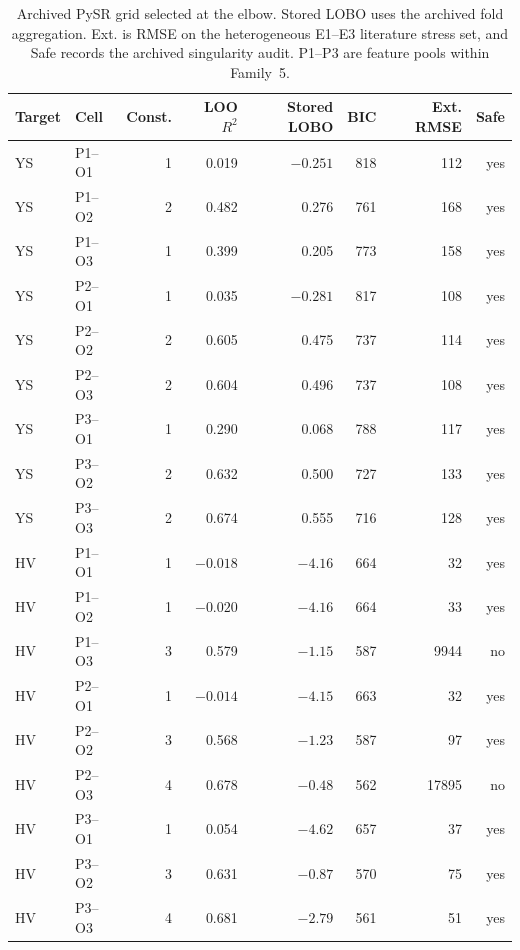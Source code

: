 \documentclass[a4paper,11pt]{article}
\begin{document}
\begin{table}[H]
\centering
\caption{Archived PySR grid selected at the elbow. Stored LOBO uses the archived fold aggregation. Ext. is RMSE on the heterogeneous E1--E3 literature stress set, and Safe records the archived singularity audit. P1--P3 are feature pools within Family~5.}
\label{tab:pysrgrid}
\footnotesize
\setlength{\tabcolsep}{3.5pt}
\begin{tabular}{llrrrrrr}
\toprule
Target & Cell & Const. & LOO $R^2$ & Stored LOBO & BIC & Ext. RMSE & Safe \\
\midrule
YS & P1--O1 & 1 & 0.019 & $-0.251$ & 818 & 112 & yes \\
YS & P1--O2 & 2 & 0.482 & 0.276 & 761 & 168 & yes \\
YS & P1--O3 & 1 & 0.399 & 0.205 & 773 & 158 & yes \\
YS & P2--O1 & 1 & 0.035 & $-0.281$ & 817 & 108 & yes \\
YS & P2--O2 & 2 & 0.605 & 0.475 & 737 & 114 & yes \\
YS & P2--O3 & 2 & 0.604 & 0.496 & 737 & 108 & yes \\
YS & P3--O1 & 1 & 0.290 & 0.068 & 788 & 117 & yes \\
YS & P3--O2 & 2 & 0.632 & 0.500 & 727 & 133 & yes \\
YS & P3--O3 & 2 & 0.674 & 0.555 & 716 & 128 & yes \\
\midrule
HV & P1--O1 & 1 & $-0.018$ & $-4.16$ & 664 & 32 & yes \\
HV & P1--O2 & 1 & $-0.020$ & $-4.16$ & 664 & 33 & yes \\
HV & P1--O3 & 3 & 0.579 & $-1.15$ & 587 & 9944 & no \\
HV & P2--O1 & 1 & $-0.014$ & $-4.15$ & 663 & 32 & yes \\
HV & P2--O2 & 3 & 0.568 & $-1.23$ & 587 & 97 & yes \\
HV & P2--O3 & 4 & 0.678 & $-0.48$ & 562 & 17895 & no \\
HV & P3--O1 & 1 & 0.054 & $-4.62$ & 657 & 37 & yes \\
HV & P3--O2 & 3 & 0.631 & $-0.87$ & 570 & 75 & yes \\
HV & P3--O3 & 4 & 0.681 & $-2.79$ & 561 & 51 & yes \\
\bottomrule
\end{tabular}
\end{table}
\end{document}
